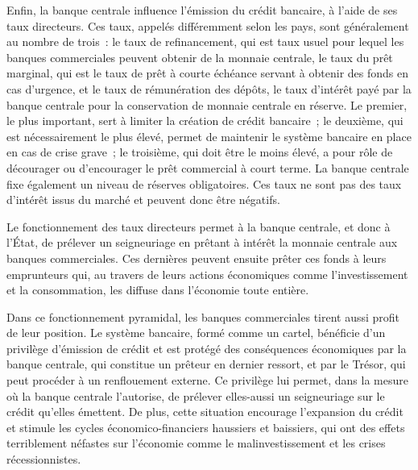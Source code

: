 Enfin, la banque centrale influence l'émission du crédit bancaire, à l'aide de ses taux directeurs. Ces taux, appelés différemment selon les pays, sont généralement au nombre de trois~: le taux de refinancement, qui est taux usuel pour lequel les banques commerciales peuvent obtenir de la monnaie centrale, le taux du prêt marginal, qui est le taux de prêt à courte échéance servant à obtenir des fonds en cas d'urgence, et le taux de rémunération des dépôts, le taux d'intérêt payé par la banque centrale pour la conservation de monnaie centrale en réserve. Le premier, le plus important, sert à limiter la création de crédit bancaire~; le deuxième, qui est nécessairement le plus élevé, permet de maintenir le système bancaire en place en cas de crise grave~; le troisième, qui doit être le moins élevé, a pour rôle de décourager ou d'encourager le prêt commercial à court terme. La banque centrale fixe également un niveau de réserves obligatoires. Ces taux ne sont pas des taux d'intérêt issus du marché et peuvent donc être négatifs.


Le fonctionnement des taux directeurs permet à la banque centrale, et donc à l'État, de prélever un seigneuriage en prêtant à intérêt la monnaie centrale aux banques commerciales. Ces dernières peuvent ensuite prêter ces fonds à leurs emprunteurs qui, au travers de leurs actions économiques comme l'investissement et la consommation, les diffuse dans l'économie toute entière.

Dans ce fonctionnement pyramidal, les banques commerciales tirent aussi profit de leur position. Le système bancaire, formé comme un cartel, bénéficie d'un privilège d'émission de crédit et est protégé des conséquences économiques par la banque centrale, qui constitue un prêteur en dernier ressort, et par le Trésor, qui peut procéder à un renflouement externe. Ce privilège lui permet, dans la mesure où la banque centrale l'autorise, de prélever elles-aussi un seigneuriage sur le crédit qu'elles émettent. De plus, cette situation encourage l'expansion du crédit et stimule les cycles économico-financiers haussiers et baissiers, qui ont des effets terriblement néfastes sur l'économie comme le malinvestissement et les crises récessionnistes.

